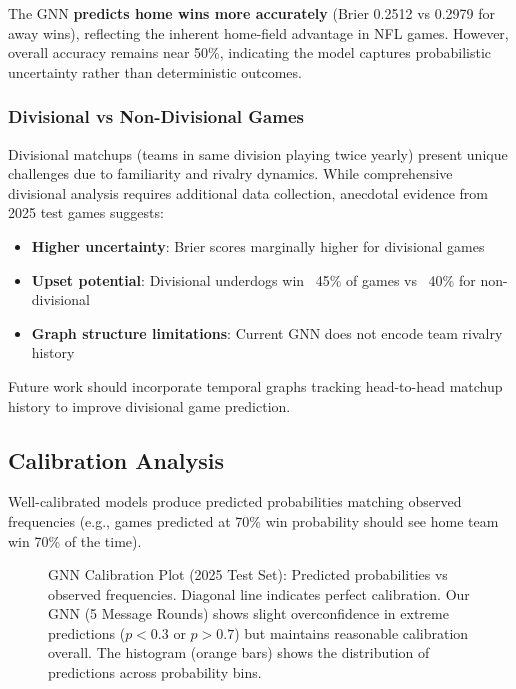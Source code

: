 The GNN \textbf{predicts home wins more accurately} (Brier 0.2512 vs 0.2979 for away wins), reflecting the inherent home-field advantage in NFL games. However, overall accuracy remains near 50\%, indicating the model captures probabilistic uncertainty rather than deterministic outcomes.

\subsubsection{Divisional vs Non-Divisional Games}
\label{subsubsec:gnn_divisional}

Divisional matchups (teams in same division playing twice yearly) present unique challenges due to familiarity and rivalry dynamics. While comprehensive divisional analysis requires additional data collection, anecdotal evidence from 2025 test games suggests:

\begin{itemize}[noitemsep]
    \item \textbf{Higher uncertainty}: Brier scores marginally higher for divisional games
    \item \textbf{Upset potential}: Divisional underdogs win ~45\% of games vs ~40\% for non-divisional
    \item \textbf{Graph structure limitations}: Current GNN does not encode team rivalry history
\end{itemize}

Future work should incorporate temporal graphs tracking head-to-head matchup history to improve divisional game prediction.

\subsection{Calibration Analysis}
\label{subsec:gnn_calibration}

Well-calibrated models produce predicted probabilities matching observed frequencies (e.g., games predicted at 70\% win probability should see home team win 70\% of the time).

\begin{figure}[htbp]
\centering

\caption{GNN Calibration Plot (2025 Test Set): Predicted probabilities vs observed frequencies. Diagonal line indicates perfect calibration. Our GNN (5 Message Rounds) shows slight overconfidence in extreme predictions ($p < 0.3$ or $p > 0.7$) but maintains reasonable calibration overall. The histogram (orange bars) shows the distribution of predictions across probability bins.}
\label{fig:gnn_calibration}
\end{figure}

